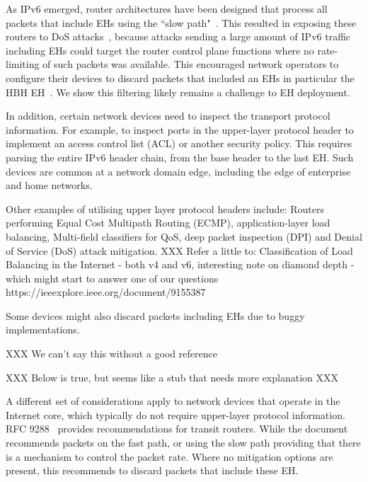 \documentclass[conference]{IEEEtran}
\begin{document}

As IPv6 emerged, router architectures have been designed that process all packets that include EHs using the ``slow path"~\cite{ietf-v6ops-hbh-03}.  This resulted in exposing these routers to DoS attacks~\cite{naagas2021deh}, because attacks sending a large amount of IPv6 traffic including EHs could target the router control plane functions where no rate-limiting of such packets was available. This encouraged
network operators to configure their devices to discard packets that included an EHs
in particular the HBH EH~\cite{ietf-v6ops-hbh-03}. We show this filtering likely remains a challenge to EH deployment.

In addition, certain network devices need to inspect the transport protocol information. For example, to inspect ports in the upper-layer protocol header to implement an access control list (ACL) or another security policy.
This requires parsing the entire IPv6 header chain, from the base header to the last EH. 
Such devices are common at a network domain edge, including the edge of enterprise and home networks.

Other examples of utilising upper layer protocol headers include: Routers performing Equal Cost Multipath Routing (ECMP), application-layer load balancing, Multi-field classifiers for QoS, deep packet inspection (DPI) and Denial of Service (DoS) attack mitigation. 
XXX
Refer a little to:
Classification of Load Balancing in the Internet - both v4 and v6, interesting note on diamond depth - which might start to answer one of our questions
https://ieeexplore.ieee.org/document/9155387

Some devices might also discard packets including EHs due to buggy implementations.

XXX We can't say this without a good reference

XXX Below is true, but seems like a stub that needs more explanation XXX

A different set of considerations apply to network devices that operate in the Internet core, which typically do not require upper-layer protocol information.
RFC 9288~\cite{rfc9288}  provides recommendations for transit routers. While the document recommends packets on the fast path, or using the slow path providing that there  is a mechanism to control the  packet rate. Where no mitigation options are present, this recommends to discard packets that include these EH. 
\end{document}
